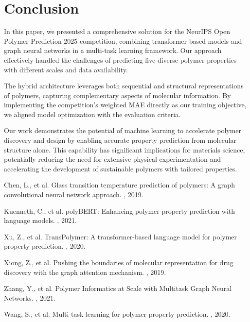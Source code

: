 \documentclass[10pt,twocolumn,letterpaper]{article}
\begin{document}
\section{Conclusion}

In this paper, we presented a comprehensive solution for the NeurIPS Open Polymer Prediction 2025 competition, combining transformer-based models and graph neural networks in a multi-task learning framework. Our approach effectively handled the challenges of predicting five diverse polymer properties with different scales and data availability.

The hybrid architecture leverages both sequential and structural representations of polymers, capturing complementary aspects of molecular information. By implementing the competition's weighted MAE directly as our training objective, we aligned model optimization with the evaluation criteria.

Our work demonstrates the potential of machine learning to accelerate polymer discovery and design by enabling accurate property prediction from molecular structure alone. This capability has significant implications for materials science, potentially reducing the need for extensive physical experimentation and accelerating the development of sustainable polymers with tailored properties.

{\small

\begin{thebibliography}{100}
Chen, L., et al. 
\newblock Glass transition temperature prediction of polymers: A graph convolutional neural network approach. 
, 2019.

Kuenneth, C., et al. 
\newblock polyBERT: Enhancing polymer property prediction with language models.
, 2021.

Xu, Z., et al. 
\newblock TransPolymer: A transformer-based language model for polymer property prediction.
, 2020.

Xiong, Z., et al. 
\newblock Pushing the boundaries of molecular representation for drug discovery with the graph attention mechanism.
, 2019.

Zhang, Y., et al. 
\newblock Polymer Informatics at Scale with Multitask Graph Neural Networks.
, 2021.

Wang, S., et al.
\newblock Multi-task learning for polymer property prediction.
, 2020.
\end{thebibliography}
}
\end{document}
